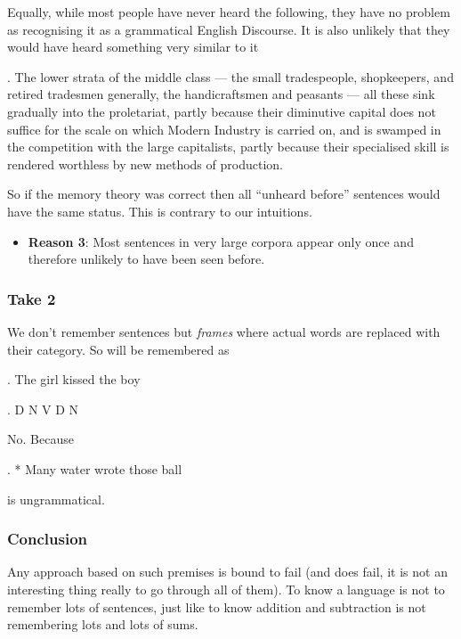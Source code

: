 \begin{frame}
  Equally, while most people have never heard the following, they have no problem as recognising it as a grammatical English Discourse.  It is also unlikely that they would have heard something very similar to it 

\ex.
The lower strata of the middle class — the small tradespeople, shopkeepers, and retired tradesmen generally, the handicraftsmen and peasants — all these sink gradually into the proletariat, partly because their diminutive capital does not suffice for the scale on which Modern Industry is carried on, and is swamped in the competition with the large capitalists, partly because their specialised skill is rendered worthless by new methods of production.

 
\end{frame}

\begin{frame}
  So if the memory theory was correct then all ``unheard before'' sentences would have the same status.  This is contrary to our intuitions.

  \begin{itemize}
  \item \textbf{Reason 3}:  Most sentences in very large corpora appear only once and therefore unlikely to have been seen before.
  \end{itemize}
\end{frame}

\begin{frame}
  \frametitle{Take 2}

We don't remember sentences but \textit{frames} where actual words are replaced with their category.  So \Next will be remembered as \NNext

\ex.
The girl kissed the boy

\ex. D N V D N


No.  Because 

\ex.
* Many water wrote those ball

is ungrammatical.


\end{frame}

\begin{frame}
  \frametitle{Conclusion}

Any approach based on such premises is bound to fail (and does fail, it is not an interesting thing really to go through all of them).  To know a language is not to remember lots of sentences, just like to know addition and subtraction is not remembering lots and lots of sums. 
\end{frame}

